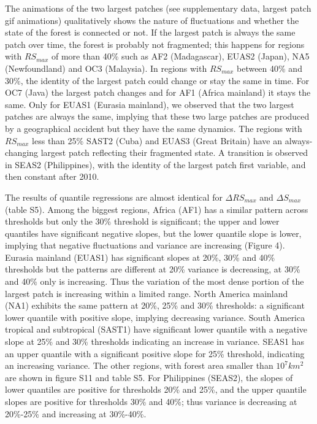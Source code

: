\documentclass[]{article}
\begin{document}
The animations of the two largest patches (see supplementary data,
largest patch gif animations) qualitatively shows the nature of
fluctuations and whether the state of the forest is connected or not. If
the largest patch is always the same patch over time, the forest is
probably not fragmented; this happens for regions with \(RS_{max}\) of
more than 40\% such as AF2 (Madagascar), EUAS2 (Japan), NA5
(Newfoundland) and OC3 (Malaysia). In regions with \(RS_{max}\) between
40\% and 30\%, the identity of the largest patch could change or stay
the same in time. For OC7 (Java) the largest patch changes and for AF1
(Africa mainland) it stays the same. Only for EUAS1 (Eurasia mainland),
we observed that the two largest patches are always the same, implying
that these two large patches are produced by a geographical accident but
they have the same dynamics. The regions with \(RS_{max}\) less than
25\% SAST2 (Cuba) and EUAS3 (Great Britain) have an always-changing
largest patch reflecting their fragmented state. A transition is
observed in SEAS2 (Philippines), with the identity of the largest patch
first variable, and then constant after 2010.

The results of quantile regressions are almost identical for
\(\Delta RS_{max}\) and \(\Delta S_{max}\) (table S5). Among the biggest
regions, Africa (AF1) has a similar pattern across thresholds but only
the 30\% threshold is significant; the upper and lower quantiles have
significant negative slopes, but the lower quantile slope is lower,
implying that negative fluctuations and variance are increasing (Figure
4). Eurasia mainland (EUAS1) has significant slopes at 20\%, 30\% and
40\% thresholds but the patterns are different at 20\% variance is
decreasing, at 30\% and 40\% only is increasing. Thus the variation of
the most dense portion of the largest patch is increasing within a
limited range. North America mainland (NA1) exhibits the same pattern at
20\%, 25\% and 30\% thresholds: a significant lower quantile with
positive slope, implying decreasing variance. South America tropical and
subtropical (SAST1) have significant lower quantile with a negative
slope at 25\% and 30\% thresholds indicating an increase in variance.
SEAS1 has an upper quantile with a significant positive slope for 25\%
threshold, indicating an increasing variance. The other regions, with
forest area smaller than \(10^{7} \si{km^2}\) are shown in figure S11
and table S5. For Philippines (SEAS2), the slopes of lower quantiles are
positive for thresholds 20\% and 25\%, and the upper quantile slopes are
positive for thresholds 30\% and 40\%; thus variance is decreasing at
20\%-25\% and increasing at 30\%-40\%.
\end{document}
